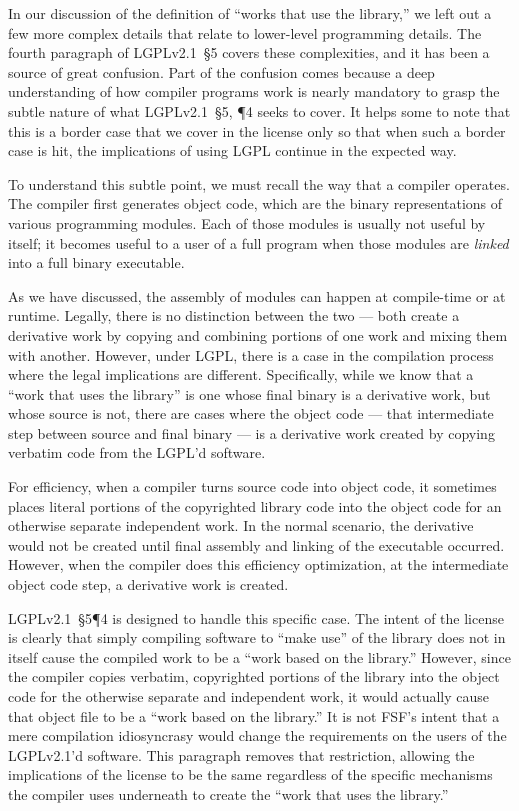In our discussion of the definition of ``works that use the library,'' we
left out a few more complex details that relate to lower-level programming
details. The fourth paragraph of LGPLv2.1~\S5 covers these complexities,
and it has been a source of great confusion. Part of the confusion comes
because a deep understanding of how compiler programs work is nearly
mandatory to grasp the subtle nature of what LGPLv2.1~\S5, \P 4 seeks to
cover. It helps some to note that this is a border case that we cover in
the license only so that when such a border case is hit, the implications
of using LGPL continue in the expected way.

To understand this subtle point, we must recall the way that a compiler
operates. The compiler first generates object code, which are the binary
representations of various programming modules. Each of those modules is
usually not useful by itself; it becomes useful to a user of a full program
when those modules are {\em linked\/} into a full binary executable.

As we have discussed, the assembly of modules can happen at compile-time
or at runtime. Legally, there is no distinction between the two --- both
create a derivative work by copying and combining portions of one work and
mixing them with another. However, under LGPL, there is a case in the
compilation process where the legal implications are different.
Specifically, while we know that a ``work that uses the library'' is one
whose final binary is a derivative work, but whose source is not, there
are cases where the object code --- that intermediate step between source
and final binary --- is a derivative work created by copying verbatim code
from the LGPL'd software.

For efficiency, when a compiler turns source code into object code, it
sometimes places literal portions of the copyrighted library code into the
object code for an otherwise separate independent work. In the normal
scenario, the derivative would not be created until final assembly and
linking of the executable occurred. However, when the compiler does this
efficiency optimization, at the intermediate object code step, a
derivative work is created.

LGPLv2.1~\S5\P4 is designed to handle this specific case. The intent of
the license is clearly that simply compiling software to ``make use'' of
the library does not in itself cause the compiled work to be a ``work
based on the library.''  However, since the compiler copies verbatim,
copyrighted portions of the library into the object code for the otherwise
separate and independent work, it would actually cause that object file to be a
``work based on the library.''  It is not FSF's intent that a mere
compilation idiosyncrasy would change the requirements on the users of the
LGPLv2.1'd software. This paragraph removes that restriction, allowing the
implications of the license to be the same regardless of the specific
mechanisms the compiler uses underneath to create the ``work that uses the
library.''

